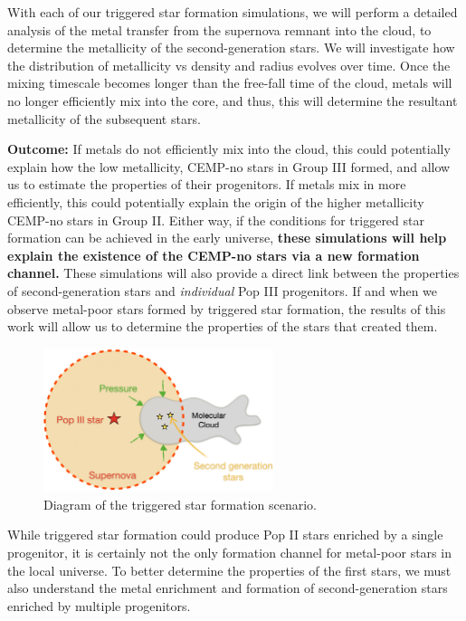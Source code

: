 \documentclass[letterpaper, 12pt]{article}
\begin{document}
With each of our triggered star formation simulations, we will perform a detailed analysis of the metal transfer from the supernova remnant into the cloud, to determine the metallicity of the second-generation stars. We will investigate how the distribution of metallicity vs density and radius evolves over time. Once the mixing timescale becomes longer than the free-fall time of the cloud, metals will no longer efficiently mix into the core, and thus, this will determine the resultant metallicity of the subsequent stars. 

\textbf{Outcome:} If metals do not efficiently mix into the cloud, this could potentially explain how the low metallicity, CEMP-no stars in Group III formed, and allow us to estimate the properties of their progenitors. If metals mix in more efficiently, this could potentially explain the origin of the higher metallicity CEMP-no stars in Group II. Either way, if the conditions for triggered star formation can be achieved in the early universe, \textbf{these simulations will help explain the existence of the CEMP-no stars via a new formation channel.} These simulations will also provide a direct link between the properties of second-generation stars and \textit{individual} Pop III progenitors. If and when we observe metal-poor stars formed by triggered star formation, the results of this work will allow us to determine the properties of the stars that created them.


\begin{figure}
  \includegraphics[width=0.6\textwidth]{figures/tsf2}
  \caption{Diagram of the triggered star formation scenario.}
  \label{fig:tsf}
\end{figure}

While triggered star formation could produce Pop II stars enriched by a single progenitor, it is certainly not the only formation channel for metal-poor stars in the local universe. To better determine the properties of the first stars, we must also understand the metal enrichment and formation of second-generation stars enriched by multiple progenitors.
\end{document}
